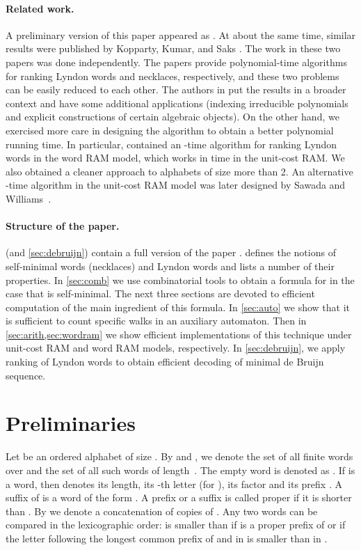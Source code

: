 \documentclass{article}
\theoremstyle{definition}
\theoremstyle{remark}
\begin{document}
\paragraph{\bf Related work.}
A preliminary version of this paper
appeared as \cite{DBLP:conf/cpm/KociumakaRR14}.
At about the same time, similar results were published by Kopparty, Kumar, and Saks \cite{DBLP:conf/icalp/KoppartyKS14}.
The work in these two papers was done independently.
The papers provide polynomial-time algorithms for ranking Lyndon words and necklaces, respectively,
and these two problems can be easily reduced  to each other.
The authors in \cite{DBLP:conf/icalp/KoppartyKS14}
put the results in a broader context and have some additional applications
(indexing irreducible polynomials and explicit constructions of certain algebraic objects).
On the other hand, we exercised more care in designing the algorithm to obtain a better polynomial running time.
In particular, \cite{DBLP:conf/cpm/KociumakaRR14} contained an -time
algorithm for ranking Lyndon words in the word RAM model,
which works in  time in the unit-cost RAM.
We also obtained a cleaner approach to alphabets of size more than 2.
An alternative -time algorithm in the unit-cost RAM model was later designed by Sawada and Williams~\cite{DBLP:journals/jda/SawadaW17}.

\paragraph{\bf Structure of the paper.}
 (and \ref{sec:debruijn}) contain a full version of the paper \cite{DBLP:conf/cpm/KociumakaRR14}.
 defines the notions of self-minimal words (necklaces) and Lyndon words and lists a number of their properties.
In \cref{sec:comb} we use combinatorial tools to obtain a formula for  in the case that  is self-minimal.
The next three sections are devoted to efficient computation of the main ingredient of this formula.
In \cref{sec:auto} we show that it is sufficient to count specific walks in an auxiliary automaton.
Then in \cref{sec:arith,sec:wordram} we show efficient implementations of this technique under unit-cost RAM
and word RAM models, respectively.
In \cref{sec:debruijn}, we apply ranking of Lyndon words to obtain efficient decoding of minimal de Bruijn sequence.


\section{Preliminaries}\label{sec:prelim}
Let  be an ordered alphabet of size .
By  and , we denote the set of all finite words over  and the set of all such words of length~.
The empty word is denoted as .
If  is a word, then  denotes its length,  its -th letter
(for ),  its factor 
and  its prefix .
A suffix of  is a word of the form .
A prefix or a suffix is called proper if it is shorter than .
By  we denote a concatenation of  copies of .
Any two words can be compared in the lexicographic order:
 is smaller than  if  is a proper prefix of  or if the letter following the longest common prefix
of  and  in  is smaller than in .
\end{document}
